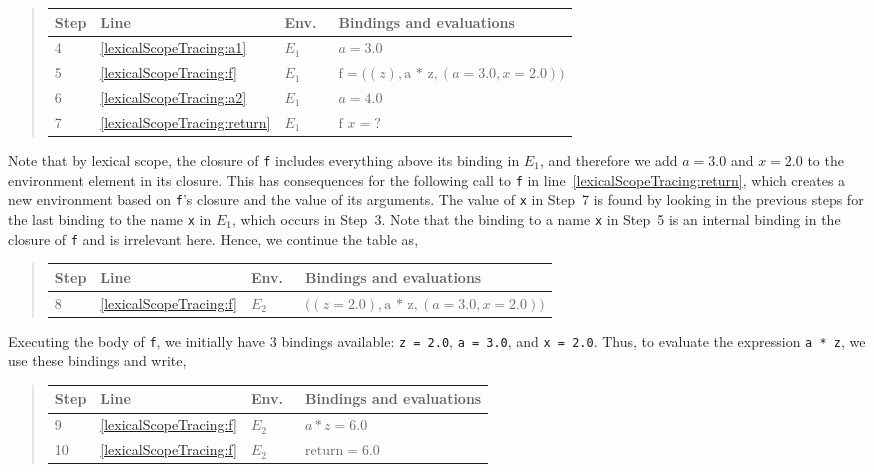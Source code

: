 \documentclass[fsharpNotes.tex]{subfiles}
\begin{document}
\begin{quote}
  \begin{tabular*}{0.9\linewidth}{l|lll}
    Step & Line & Env.\ & Bindings and evaluations\\
    \hline
    4 & \ref{lexicalScopeTracing:a1} & $E_1$ & $a = 3.0$\\
    5 & \ref{lexicalScopeTracing:f} & $E_1$ & $\text{f} = \big((z), \text{a * z}, (a = 3.0, x = 2.0)\big)$\\
    6 & \ref{lexicalScopeTracing:a2} & $E_1$ & $a = 4.0$\\
    7 & \ref{lexicalScopeTracing:return} & $E_1$ & $\text{f } x = \text{?}$
  \end{tabular*}
\end{quote}
Note that by lexical scope, the closure of \lstinline!f! includes everything above its binding in $E_1$, and therefore we add $a = 3.0$ and $x = 2.0$ to the environment element in its closure. This has consequences for the following call to \lstinline!f! in line~\ref{lexicalScopeTracing:return}, which creates a new environment based on \lstinline{f}'s closure and the value of its arguments. The value of \lstinline{x} in Step~7 is found by looking in the previous steps for the last binding to the name \lstinline{x} in $E_1$, which occurs in Step~3. Note that the binding to a name \lstinline{x} in Step~5 is an internal binding in the closure of \lstinline{f} and is irrelevant here. Hence, we continue the table as,
\begin{quote}
  \begin{tabular*}{0.9\linewidth}{l|lll}
    Step & Line & Env.\ & Bindings and evaluations\\
    \hline
    8 & \ref{lexicalScopeTracing:f} & $E_2$ & $\big((z = 2.0), \text{a * z}, (a = 3.0, x = 2.0)\big)$
  \end{tabular*}
\end{quote}
Executing the body of \lstinline{f}, we initially have 3 bindings available: \lstinline{z = 2.0}, \lstinline{a = 3.0}, and \lstinline{x = 2.0}. Thus, to evaluate the expression \lstinline{a * z}, we use these bindings and write,
\begin{quote}
  \begin{tabular*}{0.9\linewidth}{l|lll}
    Step & Line & Env.\ & Bindings and evaluations\\
    \hline
    9 & \ref{lexicalScopeTracing:f} & $E_2$ & $a * z = 6.0$\\
    10 & \ref{lexicalScopeTracing:f} & $E_2$ & $\text{return} = 6.0$
  \end{tabular*}
\end{quote}
\end{document}
